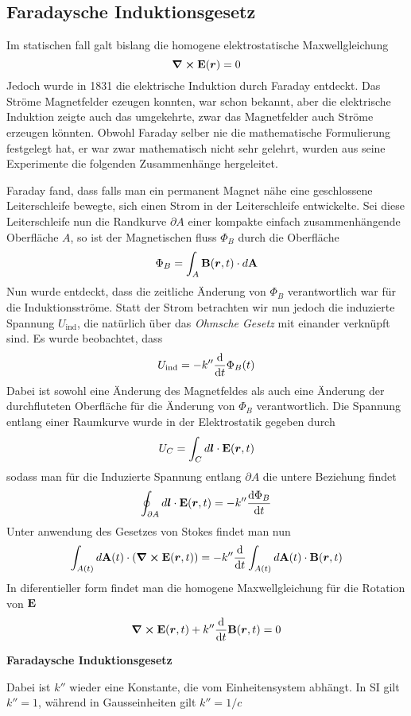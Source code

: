 \clearpage
\subsection{Faradaysche Induktionsgesetz}%
\label{sub:faradaysche-induktionsgesetz}
Im statischen fall galt bislang die homogene elektrostatische Maxwellgleichung
\begin{equation*}
  \curl \vb E(\vb*r) = 0
\end{equation*}
Jedoch wurde in 1831 die elektrische Induktion durch Faraday entdeckt. Das Ströme Magnetfelder ezeugen konnten, war schon bekannt, aber die elektrische Induktion zeigte auch das umgekehrte, zwar das Magnetfelder auch Ströme erzeugen könnten. Obwohl Faraday selber nie die
mathematische Formulierung festgelegt hat, er war zwar mathematisch nicht sehr gelehrt, wurden aus seine Experimente die folgenden Zusammenhänge hergeleitet.

Faraday fand, dass falls man ein permanent Magnet nähe eine geschlossene
Leiterschleife bewegte, sich einen Strom in der Leiterschleife entwickelte.
Sei diese Leiterschleife nun die Randkurve $\partial A$ einer kompakte einfach zusammenhängende Oberfläche $A$, so ist der Magnetischen fluss $\Phi_B$ durch die Oberfläche
\begin{equation}
  \Phi_B = \int_A \vb B(\vb*r, t) \cdot d\vb A
\end{equation}
Nun wurde entdeckt, dass die zeitliche Änderung von $\Phi_B$ verantwortlich war für die Induktionsströme. Statt der Strom betrachten wir nun jedoch die
induzierte Spannung $U_\text{ind}$, die natürlich über das \textit{Ohmsche Gesetz} mit einander verknüpft sind. Es wurde beobachtet, dass
\begin{equation}
  U_\text{ind} = -k''\dv t \Phi_B(t)
\end{equation}
Dabei ist sowohl eine Änderung des Magnetfeldes als auch eine Änderung der durchfluteten Oberfläche für die Änderung von $\Phi_B$ verantwortlich.
Die Spannung entlang einer Raumkurve wurde in der Elektrostatik gegeben durch
\begin{equation}
  U_{C} = \int_{C} d\vb*l \cdot \vb E(\vb*r, t)
\end{equation}
sodass man für die Induzierte Spannung entlang $\partial A$ die untere Beziehung findet
\begin{equation}
  \oint_{\partial A} d\vb*l \cdot \vb E(\vb*r, t) = -k''\dv{\Phi_B}{t} (t)
\end{equation}
Unter anwendung des Gesetzes von Stokes findet man nun
\begin{equation}
  \int_{A(t)} d\vb A(t) \cdot (\curl \vb E(\vb*r, t)) = -k'' \dv t \int_{A(t)} d\vb A(t) \cdot \vb B(\vb*r, t)
\end{equation}
In diferentieller form findet man die homogene Maxwellgleichung für die Rotation von $\vb E$
\begin{equation}
  \curl \vb E(\vb*r, t) + k''\dv t \vb B(\vb*r, t) = 0
\end{equation}
\begin{center}
  \textbf{Faradaysche Induktionsgesetz} 
\end{center}
Dabei ist $k''$ wieder eine Konstante, die vom Einheitensystem abhängt. In SI gilt $k''=1$, während in Gausseinheiten gilt $k''=1/c$

